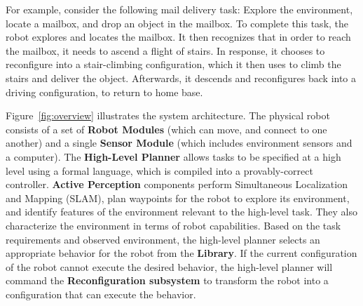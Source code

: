 \documentclass[journal]{IEEEtran}
\begin{document}
For example, consider the following mail delivery task: Explore the environment, locate a mailbox, and drop an object in the mailbox.  To complete this task, the robot explores and locates the mailbox. It then recognizes that in order to reach the mailbox, it needs to ascend a flight of stairs. In response, it chooses to reconfigure into a stair-climbing configuration, which it then uses to climb the stairs and deliver the object.  Afterwards, it descends and reconfigures back into a driving configuration, to return to home base.

Figure~\ref{fig:overview} illustrates the system architecture.
The physical robot consists of a set of \textbf{Robot Modules} (which can move, and connect to one another) and a single \textbf{Sensor Module} (which includes environment sensors and a computer).
The \textbf{High-Level Planner} allows tasks to be specified at a high level using a formal language, which is compiled into a provably-correct controller.
\textbf{Active Perception} components perform Simultaneous Localization and Mapping (SLAM), plan waypoints for the robot to explore its environment, and identify features of the environment relevant to the high-level task. They also characterize the environment in terms of robot capabilities.
Based on the task requirements and observed environment, the high-level planner selects an appropriate behavior for the robot from the \textbf{Library}.
If the current configuration of the robot cannot execute the desired behavior, the high-level planner will command the \textbf{Reconfiguration subsystem} to transform the robot into a configuration that can execute the behavior.
\end{document}
